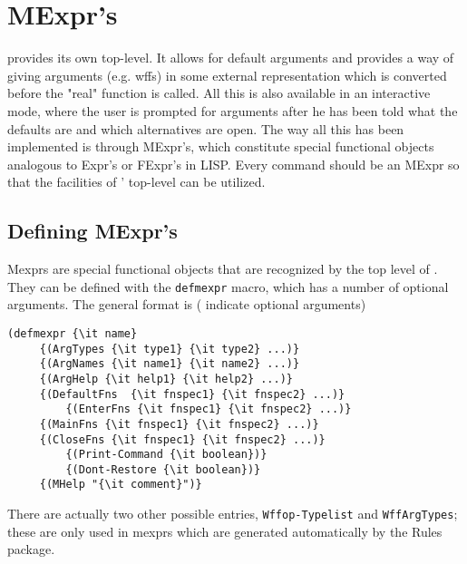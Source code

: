 \chapter{MExpr's} \label{defmexprs}
\TPS provides its own top-level.  It allows for default arguments
and provides a way of giving arguments (e.g. wffs) in some external
representation which is converted before the "real" function is called.
All this is also available in an interactive mode, where the user is
prompted for arguments after he has been told what the defaults are
and which alternatives are open.  The way all this has been implemented
is through MExpr's, which constitute special functional objects analogous
to Expr's or FExpr's in LISP.  Every \TPS command should be an MExpr
so that the facilities of \TPS' top-level can be utilized. 

\section{Defining MExpr's} \label{mexprargs}
Mexprs are special functional objects that are
recognized by the top level of \tps.
They can be defined with the {\tt defmexpr} macro, which has
a number of optional arguments.
The general format is ({\tt {}} indicate optional arguments)
\begin{verbatim}
(defmexpr {\it name}
	 {(ArgTypes {\it type1} {\it type2} ...)}
	 {(ArgNames {\it name1} {\it name2} ...)}
	 {(ArgHelp {\it help1} {\it help2} ...)}
	 {(DefaultFns  {\it fnspec1} {\it fnspec2} ...)}
         {(EnterFns {\it fnspec1} {\it fnspec2} ...)}
	 {(MainFns {\it fnspec1} {\it fnspec2} ...)}
	 {(CloseFns {\it fnspec1} {\it fnspec2} ...)}
         {(Print-Command {\it boolean})}
         {(Dont-Restore {\it boolean})}
	 {(MHelp "{\it comment}")}
\end{verbatim}

There are actually two other possible entries, {\tt Wffop-Typelist} and {\tt WffArgTypes}; these
are only used in mexprs which are generated automatically by the Rules package.

